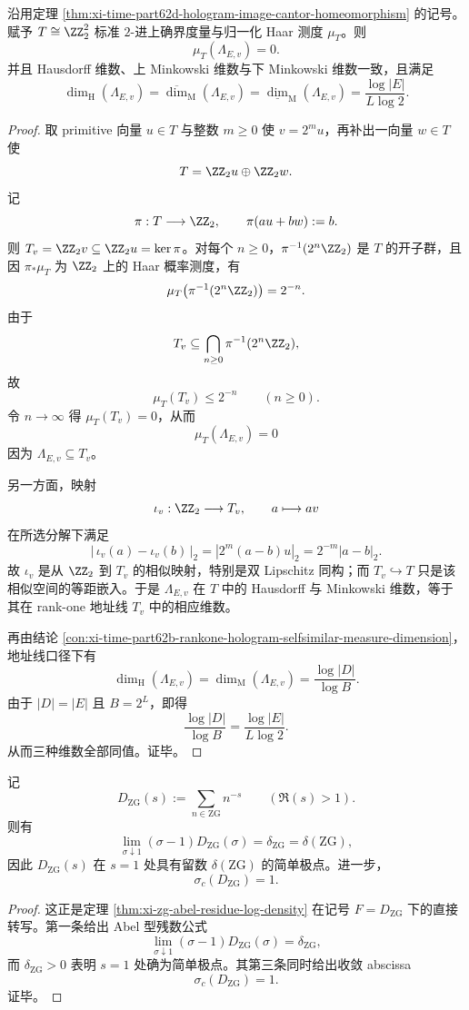 \begin{theorem}\label{thm:xi-time-part62d-hologram-image-zero-haar-dimension}
沿用定理 \ref{thm:xi-time-part62d-hologram-image-cantor-homeomorphism} 的记号。赋予
\(
T\cong \ZZ_2^2
\)
标准 \(2\)-进上确界度量与归一化 Haar 测度 \(\mu_T\)。则
\[
\mu_T(\Lambda_{E,v})=0.
\]
并且 Hausdorff 维数、上 Minkowski 维数与下 Minkowski 维数一致，且满足
\[
\dim_{\mathrm H}(\Lambda_{E,v})
=
\overline{\dim}_{\mathrm M}(\Lambda_{E,v})
=
\underline{\dim}_{\mathrm M}(\Lambda_{E,v})
=
\frac{\log |E|}{L\log 2}.
\]
\end{theorem}
\begin{proof}
取 primitive 向量 \(u\in T\) 与整数 \(m\ge 0\) 使 \(v=2^m u\)，再补出一向量 \(w\in T\) 使
\[
T=\ZZ_2u\oplus \ZZ_2w.
\]
记
\[
\pi:T\longrightarrow \ZZ_2,
\qquad
\pi(au+bw):=b.
\]
则 \(T_v=\ZZ_2v\subseteq \ZZ_2u=\ker \pi\)。对每个 \(n\ge 0\)，\(\pi^{-1}(2^n\ZZ_2)\) 是 \(T\) 的开子群，且因 \(\pi_*\mu_T\) 为 \(\ZZ_2\) 上的 Haar 概率测度，有
\[
\mu_T\bigl(\pi^{-1}(2^n\ZZ_2)\bigr)=2^{-n}.
\]
由于
\[
T_v\subseteq \bigcap_{n\ge 0}\pi^{-1}(2^n\ZZ_2),
\]
故
\[
\mu_T(T_v)\le 2^{-n}\qquad (n\ge 0).
\]
令 \(n\to\infty\) 得 \(\mu_T(T_v)=0\)，从而
\[
\mu_T(\Lambda_{E,v})=0
\]
因为 \(\Lambda_{E,v}\subseteq T_v\)。

另一方面，映射
\[
\iota_v:\ZZ_2\longrightarrow T_v,
\qquad
a\longmapsto av
\]
在所选分解下满足
\[
|\,\iota_v(a)-\iota_v(b)\,|_2
=
|2^m(a-b)u|_2
=
2^{-m}|a-b|_2.
\]
故 \(\iota_v\) 是从 \(\ZZ_2\) 到 \(T_v\) 的相似映射，特别是双 Lipschitz 同构；而 \(T_v\hookrightarrow T\) 只是该相似空间的等距嵌入。于是 \(\Lambda_{E,v}\) 在 \(T\) 中的 Hausdorff 与 Minkowski 维数，等于其在 rank-one 地址线 \(T_v\) 中的相应维数。

再由结论 \ref{con:xi-time-part62b-rankone-hologram-selfsimilar-measure-dimension}，地址线口径下有
\[
\dim_{\mathrm H}(\Lambda_{E,v})
=
\dim_{\mathrm M}(\Lambda_{E,v})
=
\frac{\log |D|}{\log B}.
\]
由于 \(|D|=|E|\) 且 \(B=2^L\)，即得
\[
\frac{\log |D|}{\log B}=\frac{\log |E|}{L\log 2}.
\]
从而三种维数全部同值。证毕。
\end{proof}

\begin{theorem}\label{thm:xi-time-part62d-zg-dirichlet-tauberian-pole-abscissa}
记
\[
D_{\mathrm{ZG}}(s):=\sum_{n\in \mathrm{ZG}}n^{-s}
\qquad (\Re(s)>1).
\]
则有
\[
\lim_{\sigma\downarrow 1}(\sigma-1)D_{\mathrm{ZG}}(\sigma)=\delta_{\mathrm{ZG}}=\delta(\mathrm{ZG}),
\]
因此 \(D_{\mathrm{ZG}}(s)\) 在 \(s=1\) 处具有留数 \(\delta(\mathrm{ZG})\) 的简单极点。进一步，
\[
\sigma_c(D_{\mathrm{ZG}})=1.
\]
\end{theorem}
\begin{proof}
这正是定理 \ref{thm:xi-zg-abel-residue-log-density} 在记号
\(
F=D_{\mathrm{ZG}}
\)
下的直接转写。第一条给出 Abel 型残数公式
\[
\lim_{\sigma\downarrow 1}(\sigma-1)D_{\mathrm{ZG}}(\sigma)=\delta_{\mathrm{ZG}},
\]
而 \(\delta_{\mathrm{ZG}}>0\) 表明 \(s=1\) 处确为简单极点。其第三条同时给出收敛 abscissa
\[
\sigma_c(D_{\mathrm{ZG}})=1.
\]
证毕。
\end{proof}

